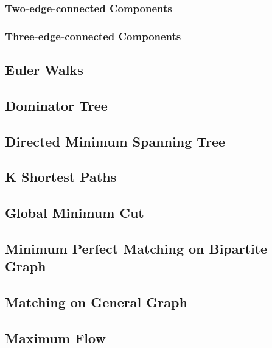 \documentclass{article}
\begin{document}
\begin{multicols}{2}
    \subsubsection{Two-edge-connected Components}
    

    \subsubsection{Three-edge-connected Components}
    

    \subsection{Euler Walks}
    

    \subsection{Dominator Tree}
    

    \subsection{Directed Minimum Spanning Tree}
    

    \subsection{K Shortest Paths}
    

    \subsection{Global Minimum Cut}
    

    \subsection{Minimum Perfect Matching on Bipartite Graph}
    

    \subsection{Matching on General Graph}
    

    \subsection{Maximum Flow}
    


\end{multicols}
\end{document}
